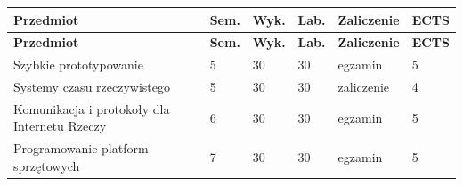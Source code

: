 \documentclass[12pt,a4paper]{article}
\newcommand{\thdrule}{\noalign{\global\setlength{\extrarowheight}{0pt}}}
\newcommand{\thdend}{\noalign{\global\setlength{\extrarowheight}{4pt}}}
\begin{document}
{\scriptsize
\begin{longtable}{m{6.5cm}m{0.7cm}m{1cm}m{1cm}m{1.7cm}m{0.7cm}}
\thdrule\toprule
\rowcolor{pjatkRed}
{\color{white}\footnotesize\textbf{\vphantom{Ag}Przedmiot}} & {\color{white}\footnotesize\textbf{\vphantom{Ag}Sem.}} & {\color{white}\footnotesize\textbf{\vphantom{Ag}Wyk.}} & {\color{white}\footnotesize\textbf{\vphantom{Ag}Lab.}} & {\color{white}\footnotesize\textbf{\vphantom{Ag}Zaliczenie}} & {\color{white}\footnotesize\textbf{\vphantom{Ag}ECTS}} \\
\midrule\thdend
\endfirsthead
\thdrule\toprule
\rowcolor{pjatkRed}
{\color{white}\footnotesize\textbf{\vphantom{Ag}Przedmiot}} & {\color{white}\footnotesize\textbf{\vphantom{Ag}Sem.}} & {\color{white}\footnotesize\textbf{\vphantom{Ag}Wyk.}} & {\color{white}\footnotesize\textbf{\vphantom{Ag}Lab.}} & {\color{white}\footnotesize\textbf{\vphantom{Ag}Zaliczenie}} & {\color{white}\footnotesize\textbf{\vphantom{Ag}ECTS}} \\
\midrule\thdend
\endhead
\rowcolor{tableRowLight} Szybkie prototypowanie & 5 & 30 & 30 & {\scriptsize egzamin} & 5 \\
\rowcolor{tableRowAlt} Systemy czasu rzeczywistego & 5 & 30 & 30 & {\scriptsize zaliczenie} & 4 \\
\rowcolor{tableRowLight} Komunikacja i protokoły dla Internetu Rzeczy & 6 & 30 & 30 & {\scriptsize egzamin} & 5 \\
\rowcolor{tableRowAlt} Programowanie platform sprzętowych & 7 & 30 & 30 & {\scriptsize egzamin} & 5 \\
\bottomrule
\end{longtable}}
\end{document}
